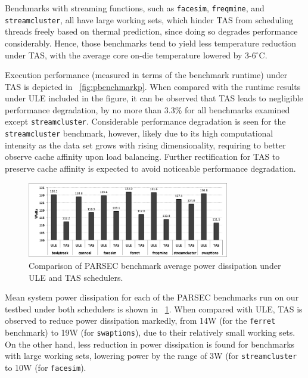 \documentclass[times, 10pt,twocolumn]{IEEEtran}
\begin{document}
Benchmarks with streaming functions, such as \texttt{facesim},
\texttt{freqmine}, and \texttt{streamcluster}, all have large working
sets, which hinder TAS from scheduling threads freely based on thermal
prediction, since doing so degrades performance considerably.  Hence,
those benchmarks tend to yield less temperature reduction under TAS,
with the average core on-die temperature lowered by 3-6$^{\circ}$C.  

Execution performance (measured in terms of the benchmark runtime) under
TAS is depicted in \figurename~\ref{fig:pbenchmarkp}.  When compared
with the runtime results under ULE included in the figure, it can be
observed that TAS leads to negligible performance degradation, by no
more than 3.3\% for all benchmarks examined except
\texttt{streamcluster}.  Considerable performance degradation is seen
for the \texttt{streamcluster} benchmark, however, likely due to its high
computational intensity as the data set grows with rising dimensionality,
requiring to better observe cache affinity upon load balancing.
Further rectification for TAS to preserve cache affinity is expected
to avoid noticeable performance degradation.

\begin{figure}[tbp]
  \includegraphics[width=1.0\linewidth,height=1.3in]{ParsecPowerConsumption.png}
  \caption{Comparison of PARSEC benchmark average power dissipation under ULE and TAS schedulers.}
  \label{fig:pbenchmark}
\end{figure}
Mean system power dissipation for each of the PARSEC benchmarks run on
our testbed under both schedulers is shown in
\figurename~\ref{fig:pbenchmark}.  When compared with ULE, TAS is
observed to reduce power dissipation markedly, from 14W (for the 
\texttt{ferret} benchmark) to 19W (for \texttt{swaptions}), due to their
relatively small working sets.  On the other hand, less reduction in
power dissipation is found for benchmarks with large working sets,
lowering power by the range of 3W (for \texttt{streamcluster} to 10W
(for \texttt{facesim}).
\end{document}
